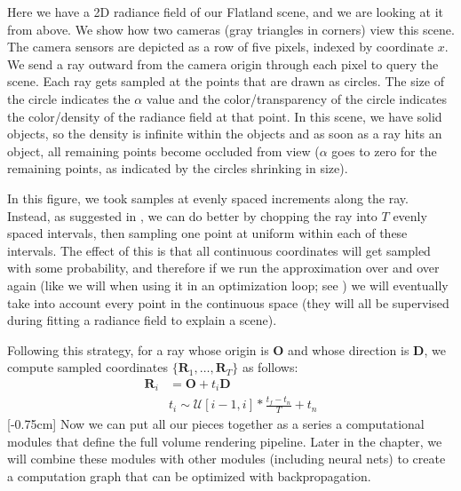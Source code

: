 Here we have a 2D radiance field of our Flatland scene, and we are looking at it from above.
We show how two cameras (gray triangles in corners) view this scene. The camera sensors are depicted as a row of five pixels, indexed by coordinate $x$.
We send a ray outward from the camera origin through each pixel to query the scene. Each ray gets sampled at the points that are drawn as circles.
The size of the circle indicates the $\alpha$ value and the color/transparency of the circle indicates the color/density of the radiance field at that point.
In this scene, we have solid objects, so the density is infinite within the objects and as soon as a ray hits an object, all remaining points become occluded
from view ($\alpha$ goes to zero for the remaining points, as indicated by the circles shrinking in size).

In this figure, we took samples at evenly spaced increments along the ray. Instead, as suggested in \cite{mildenhall2020nerf},
we can do better by chopping the ray into $T$ evenly spaced intervals, then sampling one point at uniform within each of these intervals.
The effect of this is that all continuous coordinates will get sampled with some probability, and therefore if we run the approximation over
and over again (like we will when using it in an optimization loop; see \sect{\ref{sec:nerfs:nerf_section}}) we will eventually take into
account every point in the continuous space (they will all be supervised during fitting a radiance field to explain a scene).

Following this strategy, for a ray whose origin is $\mathbf{O}$ and whose direction is $\mathbf{D}$, we compute sampled coordinates
$\{\mathbf{R}_1, \ldots, \mathbf{R}_T\}$ as follows:
\begin{align}
    \mathbf{R}_i & = \mathbf{O} + t_i\mathbf{D}                      \\
                 & t_i \sim \mathcal{U}[i-1,i]*\frac{t_f-t_n}{T}+t_n
\end{align}
[-0.75cm]
Now we can put all our pieces together as a series a computational modules that define the full volume rendering pipeline. Later in the chapter, we will combine these modules with
other modules (including neural nets) to create a computation graph that can be optimized with backpropagation.

